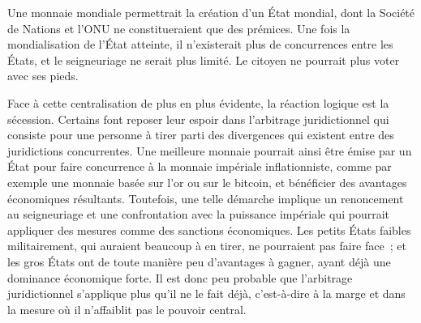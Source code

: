 Une monnaie mondiale permettrait la création d'un État mondial, dont la Société de Nations et l'ONU ne constitueraient que des prémices. Une fois la mondialisation de l'État atteinte, il n'existerait plus de concurrences entre les États, et le seigneuriage ne serait plus limité. Le citoyen ne pourrait plus voter avec ses pieds.

Face à cette centralisation de plus en plus évidente, la réaction logique est la sécession. Certains font reposer leur espoir dans l'arbitrage juridictionnel qui consiste pour une personne à tirer parti des divergences qui existent entre des juridictions concurrentes. Une meilleure monnaie pourrait ainsi être émise par un État pour faire concurrence à la monnaie impériale inflationniste, comme par exemple une monnaie basée sur l'or ou sur le bitcoin, et bénéficier des avantages économiques résultants. Toutefois, une telle démarche implique un renoncement au seigneuriage et une confrontation avec la puissance impériale qui pourrait appliquer des mesures comme des sanctions économiques. Les petits États faibles militairement, qui auraient beaucoup à en tirer, ne pourraient pas faire face~; et les gros États ont de toute manière peu d'avantages à gagner, ayant déjà une dominance économique forte. Il est donc peu probable que l'arbitrage juridictionnel s'applique plus qu'il ne le fait déjà, c'est-à-dire à la marge et dans la mesure où il n'affaiblit pas le pouvoir central. %

